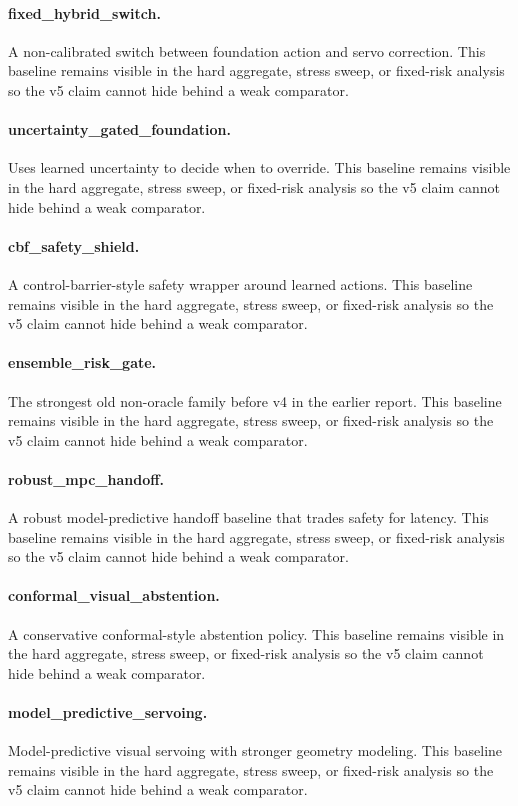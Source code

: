 \documentclass{article}
\begin{document}
\paragraph{fixed\_hybrid\_switch.} A non-calibrated switch between foundation action and servo correction.
This baseline remains visible in the hard aggregate, stress sweep, or fixed-risk analysis so the v5 claim cannot hide behind a weak comparator.
\paragraph{uncertainty\_gated\_foundation.} Uses learned uncertainty to decide when to override.
This baseline remains visible in the hard aggregate, stress sweep, or fixed-risk analysis so the v5 claim cannot hide behind a weak comparator.
\paragraph{cbf\_safety\_shield.} A control-barrier-style safety wrapper around learned actions.
This baseline remains visible in the hard aggregate, stress sweep, or fixed-risk analysis so the v5 claim cannot hide behind a weak comparator.
\paragraph{ensemble\_risk\_gate.} The strongest old non-oracle family before v4 in the earlier report.
This baseline remains visible in the hard aggregate, stress sweep, or fixed-risk analysis so the v5 claim cannot hide behind a weak comparator.
\paragraph{robust\_mpc\_handoff.} A robust model-predictive handoff baseline that trades safety for latency.
This baseline remains visible in the hard aggregate, stress sweep, or fixed-risk analysis so the v5 claim cannot hide behind a weak comparator.
\paragraph{conformal\_visual\_abstention.} A conservative conformal-style abstention policy.
This baseline remains visible in the hard aggregate, stress sweep, or fixed-risk analysis so the v5 claim cannot hide behind a weak comparator.
\paragraph{model\_predictive\_servoing.} Model-predictive visual servoing with stronger geometry modeling.
This baseline remains visible in the hard aggregate, stress sweep, or fixed-risk analysis so the v5 claim cannot hide behind a weak comparator.
\end{document}
